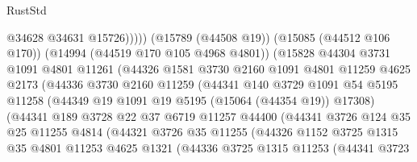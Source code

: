 \begin{lexlean}{RustStd}
\begin{coremodule}
                                @34628
                                @34631
                                @15726)))))
                      (@15789 (@44508 @19))
                      (@15085 (@44512 @106 @170))
                      (@14994 (@44519 @170 @105 @4968 @4801))
                      (@15828
                        @44304
                        @3731
                        @1091
                        @4801
                        @11261
                        (@44326
                          @1581
                          @3730
                          @2160
                          @1091
                          @4801
                          @11259
                          @4625
                          @2173
                          (@44336
                            @3730
                            @2160
                            @11259
                            (@44341
                              @140
                              @3729
                              @1091
                              @54
                              @5195
                              @11258
                              (@44349 @19 @1091 @19 @5195 (@15064 (@44354 @19)) @17308)
                              (@44341
                                @189
                                @3728
                                @22
                                @37
                                @6719
                                @11257
                                @44400
                                (@44341
                                  @3726
                                  @124
                                  @35
                                  @25
                                  @11255
                                  @4814
                                  (@44321
                                    @3726
                                    @35
                                    @11255
                                    (@44326
                                      @1152
                                      @3725
                                      @1315
                                      @35
                                      @4801
                                      @11253
                                      @4625
                                      @1321
                                      (@44336
                                        @3725
                                        @1315
                                        @11253
                                        (@44341
                                          @3723

\end{coremodule}
\end{lexlean}
